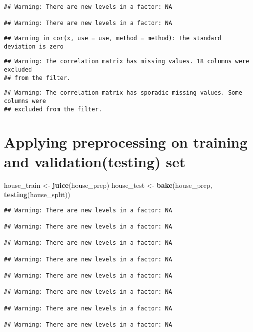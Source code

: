 \documentclass[
]{article}
\newenvironment{Shaded}{\begin{snugshade}}{\end{snugshade}}
\newcommand{\KeywordTok}[1]{\textcolor[rgb]{0.13,0.29,0.53}{\textbf{#1}}}
\newcommand{\NormalTok}[1]{#1}
\newcommand{\StringTok}[1]{\textcolor[rgb]{0.31,0.60,0.02}{#1}}
\begin{document}
\begin{verbatim}
## Warning: There are new levels in a factor: NA

## Warning: There are new levels in a factor: NA
\end{verbatim}

\begin{verbatim}
## Warning in cor(x, use = use, method = method): the standard deviation is zero
\end{verbatim}

\begin{verbatim}
## Warning: The correlation matrix has missing values. 18 columns were excluded
## from the filter.
\end{verbatim}

\begin{verbatim}
## Warning: The correlation matrix has sporadic missing values. Some columns were
## excluded from the filter.
\end{verbatim}

\hypertarget{applying-preprocessing-on-training-and-validationtesting-set}{%
\section{Applying preprocessing on training and validation(testing)
set}\label{applying-preprocessing-on-training-and-validationtesting-set}}

\begin{Shaded}
\begin{Highlighting}[]
\NormalTok{house_train <-}\StringTok{ }\KeywordTok{juice}\NormalTok{(house_prep)}
\NormalTok{house_test <-}\StringTok{ }\KeywordTok{bake}\NormalTok{(house_prep, }\KeywordTok{testing}\NormalTok{(house_split))}
\end{Highlighting}
\end{Shaded}

\begin{verbatim}
## Warning: There are new levels in a factor: NA

## Warning: There are new levels in a factor: NA

## Warning: There are new levels in a factor: NA

## Warning: There are new levels in a factor: NA

## Warning: There are new levels in a factor: NA

## Warning: There are new levels in a factor: NA

## Warning: There are new levels in a factor: NA

## Warning: There are new levels in a factor: NA
\end{verbatim}
\end{document}
